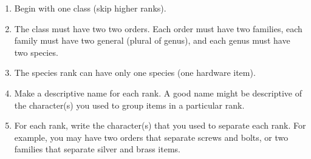 \documentclass[12pt]{exam}
\begin{document}
\begin{enumerate}

	\item Begin with one class (skip higher ranks).
	
	\item The class must have two two orders. Each order must have two
	families, each family must have two general (plural of genus), and 
	each genus must have two species.
	
	\item The species rank can have only one species (one hardware item). 

	\item Make a descriptive name for each rank. A good name might be 
	descriptive of the character(s) you used to group items in a 
	particular rank.

	\item For each rank, write the character(s) that you used to separate 
	each rank. For example, you may have two orders that separate screws 
	and bolts, or two families that separate silver and brass items.
	
	
	
	
	
	

\end{enumerate}
\end{document}
